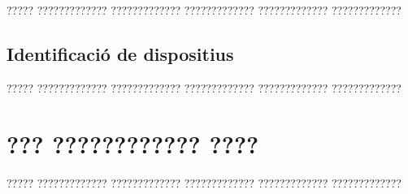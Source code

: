 \documentclass[11pt,spanish,listoffigures,listoftables]{tfgetsinf}
\begin{document}
????? ????????????? ????????????? ????????????? ????????????? ?????????????

\section{Identificació de dispositius}

????? ????????????? ????????????? ????????????? ????????????? ?????????????



\chapter{??? ???????????? ????}

????? ????????????? ????????????? ????????????? ????????????? ????????????? 



\end{document}
